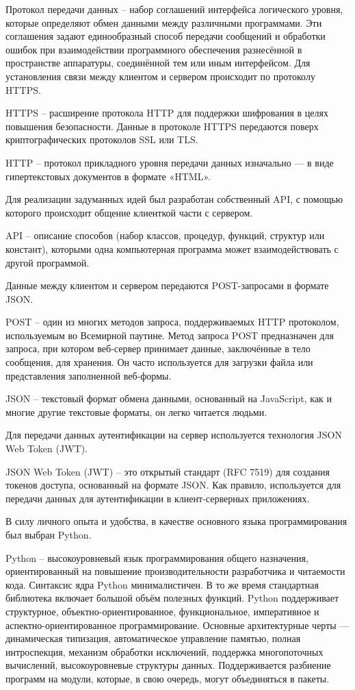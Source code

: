\documentclass[14pt,a4paper,openbib]{extarticle}
\numberwithin{equation}{section}
\begin{document}
Протокол передачи данных – набор соглашений интерфейса логического уровня, которые определяют обмен данными между различными программами. Эти соглашения задают единообразный способ передачи сообщений и обработки ошибок при взаимодействии программного обеспечения разнесённой в пространстве аппаратуры, соединённой тем или иным интерфейсом. Для установления связи между клиентом и сервером происходит по протоколу HTTPS.

HTTPS – расширение протокола HTTP для поддержки шифрования в целях повышения безопасности. Данные в протоколе HTTPS передаются поверх криптографических протоколов SSL или TLS.

HTTP – протокол прикладного уровня передачи данных изначально — в виде гипертекстовых документов в формате «HTML».

Для реализации задуманных идей был разработан собственный API, с помощью которого происходит общение клиенткой части с сервером.

API – описание способов (набор классов, процедур, функций, структур или констант), которыми одна компьютерная программа может взаимодействовать с другой программой.

Данные между клиентом и сервером передаются POST-запросами в формате JSON.

POST – один из многих методов запроса, поддерживаемых HTTP протоколом, используемым во Всемирной паутине. Метод запроса POST предназначен для запроса, при котором веб-сервер принимает данные, заключённые в тело сообщения, для хранения. Он часто используется для загрузки файла или представления заполненной веб-формы.

JSON – текстовый формат обмена данными, основанный на JavaScript, как и многие другие текстовые форматы, он легко читается людьми.

Для передачи данных аутентификации на сервер используется технология JSON Web Token (JWT).

JSON Web Token (JWT) – это открытый стандарт (RFC 7519) для создания токенов доступа, основанный на формате JSON. Как правило, используется для передачи данных для аутентификации в клиент-серверных приложениях.

В силу личного опыта и удобства, в качестве основного языка программирования был выбран Python.

Python – высокоуровневый язык программирования общего назначения, ориентированный на повышение производительности разработчика и читаемости кода. Синтаксис ядра Python минималистичен. В то же время стандартная библиотека включает большой объём полезных функций. Python поддерживает структурное, объектно-ориентированное, функциональное, императивное и аспектно-ориентированное программирование. Основные архитектурные черты — динамическая типизация, автоматическое управление памятью, полная интроспекция, механизм обработки исключений, поддержка многопоточных вычислений, высокоуровневые структуры данных. Поддерживается разбиение программ на модули, которые, в свою очередь, могут объединяться в пакеты.
\end{document}
